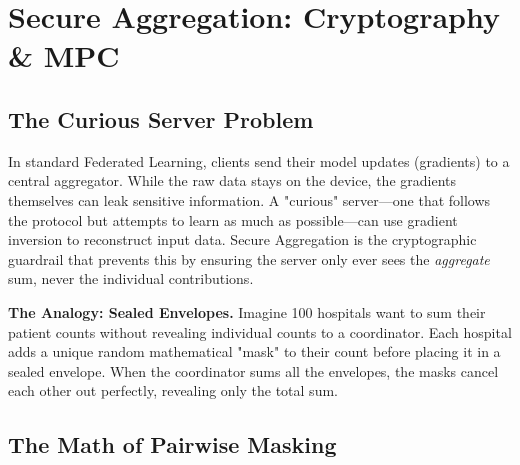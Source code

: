 
\chapter{Secure Aggregation: Cryptography \& MPC}
\label{chap:secure_aggregation}


\section{The Curious Server Problem}
\label{sec:curious_server}

In standard Federated Learning, clients send their model updates (gradients) to a central aggregator. While the raw data stays on the device, the gradients themselves can leak sensitive information. A "curious" server---one that follows the protocol but attempts to learn as much as possible---can use gradient inversion to reconstruct input data. Secure Aggregation is the cryptographic guardrail that prevents this by ensuring the server only ever sees the \textit{aggregate} sum, never the individual contributions.

\begin{svgraybox}
\textbf{The Analogy: Sealed Envelopes.} Imagine 100 hospitals want to sum their patient counts without revealing individual counts to a coordinator. Each hospital adds a unique random mathematical "mask" to their count before placing it in a sealed envelope. When the coordinator sums all the envelopes, the masks cancel each other out perfectly, revealing only the total sum.
\end{svgraybox}

\section{The Math of Pairwise Masking}
\label{sec:masking_math}

